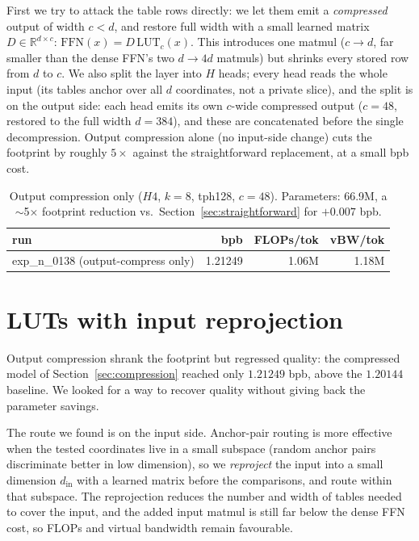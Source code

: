\documentclass[11pt]{article}
\begin{document}
First we try to attack the table rows directly: we let them emit a \emph{compressed}
output of width $c<d$, and restore full width with a small learned matrix
$D\in\mathbb{R}^{d\times c}$: $\mathrm{FFN}(x)=D\,\mathrm{LUT}_c(x)$. This introduces one
matmul ($c\!\to\!d$, far smaller than the dense FFN's two $d\!\to\!4d$ matmuls) but shrinks
every stored row from $d$ to $c$. We also split the layer into $H$ heads; every head reads the
whole input (its tables anchor over all $d$ coordinates, not a private slice), and the
split is on the output side: each head emits its own $c$-wide compressed output ($c=48$,
restored to the full width $d=384$), and these are
concatenated before the single decompression. Output compression alone (no input-side change)
cuts the footprint by roughly $5\times$ against the straightforward replacement, at a small
bpb cost.

\begin{table}[h]\centering
\begin{tabular}{lrrr}
\toprule
run & bpb & FLOPs/tok & vBW/tok \\
\midrule
exp\_n\_0138 (output-compress only) & 1.21249 & 1.06M & 1.18M \\
\bottomrule
\end{tabular}
\caption{Output compression only ($H4$, $k=8$, tph128, $c=48$). Parameters: 66.9M, a $\sim$5$\times$ footprint reduction vs.\ Section~\ref{sec:straightforward} for $+0.007$ bpb.}
\end{table}

\section{LUTs with input reprojection}

Output compression shrank the footprint but regressed quality: the compressed model of
Section~\ref{sec:compression} reached only $1.21249$ bpb, above the $1.20144$ baseline. We looked for a way to
recover quality without giving back the parameter savings.

The route we found is on the input side. Anchor-pair routing is more effective when the
tested coordinates live in a small subspace (random anchor pairs discriminate better in
low dimension), so we \emph{reproject} the input into a small dimension $d_{\mathrm{in}}$
with a learned matrix before the comparisons, and route within that subspace. The reprojection
reduces the number and width of tables needed to cover the input, and the added input matmul
is still far below the dense FFN cost, so FLOPs and virtual bandwidth remain favourable.
\end{document}

